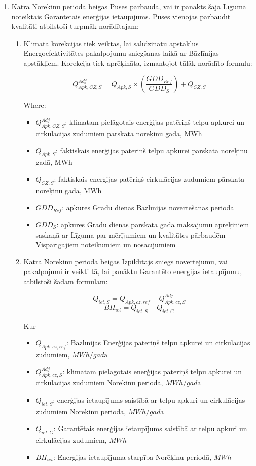 \begin{enumerate}
	\item Katra Norēķinu perioda beigās Puses pārbauda, vai ir panākts šajā Līgumā noteiktais Garantētais enerģijas ietaupījums. Puses vienojas pārbaudīt kvalitāti atbilstoši turpmāk norādītajam:
	\begin{enumerate}
		\item Klimata korekcijas tiek veiktas, lai salīdzinātu apstākļus Energoefektivitātes pakalpojumu sniegšanas laikā ar Bāzlīnijas apstākļiem. Korekcija tiek aprēķināta, izmantojot tālāk norādīto formulu:

\[ Q^{Adj}_{Apk,CZ,S} = Q_{Apk,S} \times \left( \frac{GDD_{Ref}}{GDD_S}\right) + Q_{CZ,S} \]

Where:

\begin{itemize}
	\item $Q^{Adj}_{Apk,CZ,S}$: klimatam pielāgotais enerģijas patēriņš telpu apkurei un cirkulācijas zudumiem pārskata norēķinu gadā, MWh
	\item $Q_{Apk,S}$: faktiskais enerģijas patēriņš telpu apkurei pārskata norēķinu gadā, MWh
	\item $Q_{CZ,S}$: faktiskais enerģijas patēriņš cirkulācijas zudumiem pārskata norēķinu gadā, MWh
	\item $GDD_{Ref}$: apkures Grādu dienas Bāzlīnijas novērtēšanas periodā
	\item $GDD_S$: apkures Grādu dienas pārskata gadā maksājumu aprēķiniem saskaņā ar Līguma par mērījumiem un kvalitātes pārbaudēm Vispārīgajiem noteikumiem un nosacījumiem
\end{itemize}

		\item Katra Norēķinu perioda beigās Izpildītājs sniegs novērtējumu, vai pakalpojumi ir veikti tā, lai panāktu Garantēto enerģijas ietaupījumu, atbilstoši šādām formulām:

\[ Q_{iet,S} = Q_{Apk,cz,ref} - Q^{Adj}_{Apk,cz,S} \]
\[ BH_{iet} = Q_{iet,S} - Q_{iet,G} \]

Kur

\begin{itemize}
\item $Q_{Apk,cz,ref}$: Bāzlīnijas Enerģijas patēriņš telpu apkurei un cirkulācijas zudumiem, $MWh/gadā $
\item $Q^{Adj}_{Apk,cz,S}$: klimatam pielāgotais enerģijas patēriņš telpu apkurei un cirkulācijas zudumiem Norēķinu periodā, $MWh/gadā$
\item $Q_{iet,S}$: enerģijas ietaupījums saistībā ar telpu apkuri un cirkulācijas zudumiem Norēķinu periodā, $MWh/gadā$
\item $Q_{iet,G}$: Garantētais enerģijas ietaupījums saistībā ar telpu apkuri un cirkulācijas zudumiem, $MWh$
\item $BH_{iet}$: Enerģijas ietaupījuma starpība Norēķinu periodā, $MWh$
\end{itemize}


\end{enumerate}
\end{enumerate}
